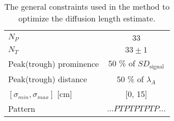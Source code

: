 \documentclass[../../CompleteThesis2/Complete_2ndDraft]{subfiles}
\begin{document}
\begin{table}[ht]
	\centering
	\begin{tabular}{lc}
		\toprule 	
		$N_P$ & 33\\[0.15cm]
		$N_T$ & $33\pm 1$\\[0.15cm]
		Peak(trough) prominence & 50 \% of $SD_{\text{signal}}$\\[0.15cm]
		Peak(trough) distance & 50 \% of $\lambda_A$\\[0.15cm]
		$[\sigma_{min}, \sigma_{max}]$ [cm] & [0, 15]\\[0.15cm]
		Pattern & $...PTPTPTPTP...$\\
		\bottomrule
	\end{tabular}
	\caption[Constraint parameters]{The general constraints used in the method to optimize the diffusion length estimate.}
	\label{Tab:ConstraintParams}
\end{table}

%
%
%
%
\end{document}
